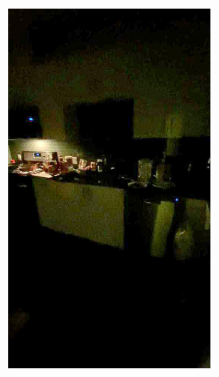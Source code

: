 \documentclass[letterpaper,12pt]{article}
\begin{document}
	\begin{figure}[htbp] 
		\centering 
		\begin{subfigure}{0.128\textwidth}
			\includegraphics[width=\linewidth]{LoLi-Phone-imgT/input}
			\captionsetup{font=scriptsize}
			\caption{}
			\label{fig: LoLi-Phone-imgT_a}
		\end{subfigure}
		\begin{subfigure}{0.128\textwidth}

\end{subfigure}
\end{figure}
\end{document}
